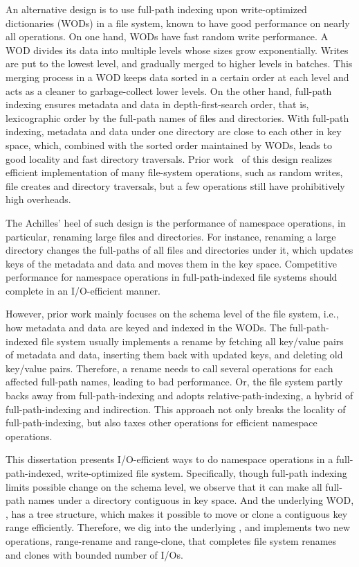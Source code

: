 An alternative design is to use full-path indexing upon write-optimized
dictionaries (WODs) in a file system, known to have good performance on nearly
all operations.
On one hand, WODs have fast random write performance.
A WOD divides its data into multiple levels whose sizes grow exponentially.
Writes are put to the lowest level, and gradually merged to higher levels in
batches.
This merging process in a WOD keeps data sorted in a certain order at each level
and acts as a cleaner to garbage-collect lower levels.
On the other hand, full-path indexing ensures metadata and data in
depth-first-search order, that is, lexicographic order by the full-path names
of files and directories.
With full-path indexing, metadata and data under one directory are close to each
other in key space, which, combined with the sorted order maintained by
WODs, leads to good locality and fast directory traversals.
Prior work~\citep{betrfs1,betrfs1tos,betrfs2,betrfs2tos,betrfs3} of this design
realizes efficient implementation of many file-system operations, such as random
writes, file creates and directory traversals,
but a few operations still have prohibitively high overheads.

The Achilles' heel of such design is the performance of namespace operations,
in particular, renaming large files and directories.
For instance, renaming a large directory changes the full-paths of all files
and directories under it, which updates keys of the metadata and
data and moves them in the key space.
Competitive performance for namespace operations in full-path-indexed file
systems should complete in an I/O-efficient manner.

However, prior work mainly focuses on the schema level of the file system, i.e.,
how metadata and data are keyed and indexed in the WODs.
The full-path-indexed file system usually implements a rename by
fetching all key/value pairs of metadata and data,
inserting them back with updated keys, and deleting old key/value pairs.
Therefore, a rename needs to call several operations for each affected full-path
names, leading to bad performance.
Or, the file system partly backs away from full-path-indexing and adopts
relative-path-indexing, a hybrid of full-path-indexing and indirection.
This approach not only breaks the locality of full-path-indexing, but also
taxes other operations for efficient namespace operations.

This dissertation presents I/O-efficient ways to do namespace operations in a
full-path-indexed, write-optimized file system.
Specifically, though full-path indexing limits possible change on the schema
level, we observe that it can make all full-path names under a directory
contiguous in key space.
And the underlying WOD, \bets, has a tree structure, which makes it possible to
move or clone a contiguous key range efficiently.
Therefore, we dig into the underlying \bets, and implements two new operations,
range-rename and range-clone, that completes file system renames and clones with
bounded number of I/Os.

